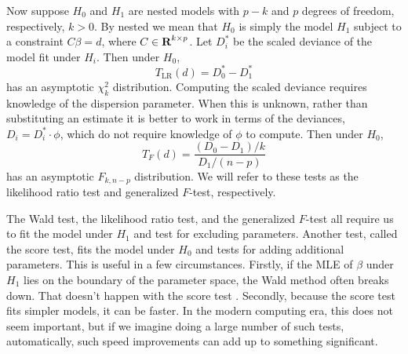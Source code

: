 \documentclass[12pt]{article}
\begin{document}
Now suppose $H_0$ and $H_1$ are nested models with $p-k$ and $p$ degrees of freedom, respectively, $k > 0$. By nested we mean that $H_0$ is simply the model $H_1$ subject to a constraint $C \beta = d$, where $C \in {\mbox{\bf R}}^{k\times p}$. Let $D_i^*$ be the scaled deviance of the model fit under $H_i$. Then under $H_0$,
\begin{displaymath}
   T_{\textrm{LR}}(d) = D_0^* - D_1^*
\end{displaymath}
has an asymptotic $\chi_{k}^2$ distribution. Computing the scaled deviance requires knowledge of the dispersion parameter. When this is unknown, rather than substituting an estimate it is better to work in terms of the deviances, $D_i = D_i^* \cdot \phi$, which do not require knowledge of $\phi$ to compute. Then under $H_0$,
\begin{displaymath}
   T_F(d) = \frac{(D_0 - D_1) / k}{D_1 / (n - p)}
\end{displaymath}
has an asymptotic $F_{k, n-p}$ distribution. We will refer to these tests as the likelihood ratio test and generalized $F$-test, respectively.

The Wald test, the likelihood ratio test, and the generalized $F$-test all require us to fit the model under $H_1$ and test for excluding parameters. Another test, called the score test, fits the model under $H_0$ and tests for adding additional parameters. This is useful in a few circumstances. Firstly, if the MLE of $\beta$ under $H_1$ lies on the boundary of the parameter space, the Wald method often breaks down. That doesn't happen with the score test \cite[\S 3.1.8]{Agresti:2012}. Secondly, because the score test fits simpler models, it can be faster. In the modern computing era, this does not seem important, but if we imagine doing a large number of such tests, automatically, such speed improvements can add up to something significant.
\end{document}
